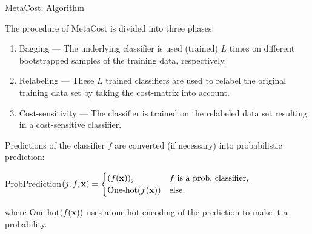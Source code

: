 \documentclass[11pt,compress,t,notes=noshow, xcolor=table]{beamer}
\begin{document}
\begin{vbframe}{MetaCost: Algorithm}
	
	\scriptsize{
%		
 	The procedure of MetaCost is divided into three phases:
		\begin{minipage}{0.53\textwidth} 
%				
				\begin{enumerate}
%					
					\scriptsize
					\item Bagging --- The underlying classifier is used (trained) $L$ times on different bootstrapped samples of the training data, respectively.
%					
					\item Relabeling --- These $L$ trained classifiers are used to relabel the original training data set by taking the cost-matrix into account.
%					
					\item Cost-sensitivity ---  The classifier is trained on the relabeled data set resulting in a cost-sensitive classifier.
%					
				\end{enumerate}
%
	\scriptsize
	\lz 
			Predictions of the classifier $f$ are converted (if necessary) into probabilistic prediction:
			\begin{center}
				\tiny
							ProbPrediction$(j,f,\mathbf{x}) = \begin{cases}
					(f(\mathbf{x}))_j & \mbox{$f$ is a prob.\ classifier,} \\
					\mbox{One-hot$(f(\mathbf{x}))$}& \mbox{else,}
				\end{cases}$
			\end{center}
%		
		\scriptsize
		where One-hot$(f(\mathbf{x}))$ uses a one-hot-encoding of the prediction to make it a probability. 
		
		\end{minipage}
		\begin{minipage}{0.45\textwidth} 
			\begin{algorithmic}
				

\end{algorithmic}
\end{minipage}}
\end{vbframe}
\end{document}
